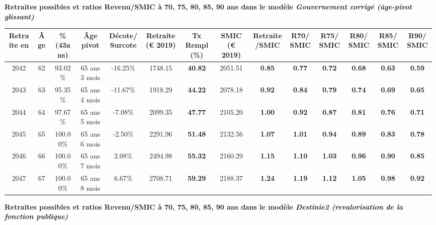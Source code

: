  \vspace{0.1cm} 
{\bf \noindent Retraites possibles et ratios Revenu/SMIC à 70, 75, 80, 85, 90 ans dans le modèle \emph{Gouvernement corrigé (âge-pivot glissant)}}  
 
\begin{adjustbox}{max width=\textwidth} 
\begin{tabular}[htb]{|c|c||c|c|c||c|c||c|c||c|c|c|c|c|} 
\hline 
 Retraite en &  Âge &  \%(43ans) &  Âge pivot &  Décote/Surcote &  Retraite (\euro{} 2019) &  Tx Rempl(\%) &  SMIC (\euro{} 2019) &  Retraite/SMIC &  R70/SMIC &  R75/SMIC &  R80/SMIC &  R85/SMIC &  R90/SMIC \\ 
\hline \hline 
 2042 &  62 &  93.02\% &  65 ans 3 mois &  -16.25\% &  1748.15 &  {\bf 40.82} &  2051.51 &  {\bf {\color{red} 0.85}} &  {\bf {\color{red} 0.77}} &  {\bf {\color{red} 0.72}} &  {\bf {\color{red} 0.68}} &  {\bf {\color{red} 0.63}} &  {\bf {\color{red} 0.59}} \\ 
\hline 
 2043 &  63 &  95.35\% &  65 ans 4 mois &  -11.67\% &  1918.29 &  {\bf 44.22} &  2078.18 &  {\bf {\color{red} 0.92}} &  {\bf {\color{red} 0.84}} &  {\bf {\color{red} 0.79}} &  {\bf {\color{red} 0.74}} &  {\bf {\color{red} 0.69}} &  {\bf {\color{red} 0.65}} \\ 
\hline 
 2044 &  64 &  97.67\% &  65 ans 5 mois &  -7.08\% &  2099.35 &  {\bf 47.77} &  2105.20 &  {\bf {\color{red} 1.00}} &  {\bf {\color{red} 0.92}} &  {\bf {\color{red} 0.87}} &  {\bf {\color{red} 0.81}} &  {\bf {\color{red} 0.76}} &  {\bf {\color{red} 0.71}} \\ 
\hline 
 2045 &  65 &  100.00\% &  65 ans 6 mois &  -2.50\% &  2291.96 &  {\bf 51.48} &  2132.56 &  {\bf 1.07} &  {\bf 1.01} &  {\bf {\color{red} 0.94}} &  {\bf {\color{red} 0.89}} &  {\bf {\color{red} 0.83}} &  {\bf {\color{red} 0.78}} \\ 
\hline 
 2046 &  66 &  100.00\% &  65 ans 7 mois &  2.08\% &  2494.98 &  {\bf 55.32} &  2160.29 &  {\bf 1.15} &  {\bf 1.10} &  {\bf 1.03} &  {\bf {\color{red} 0.96}} &  {\bf {\color{red} 0.90}} &  {\bf {\color{red} 0.85}} \\ 
\hline 
 2047 &  67 &  100.00\% &  65 ans 8 mois &  6.67\% &  2708.71 &  {\bf 59.29} &  2188.37 &  {\bf 1.24} &  {\bf 1.19} &  {\bf 1.12} &  {\bf 1.05} &  {\bf {\color{red} 0.98}} &  {\bf {\color{red} 0.92}} \\ 
\hline 
\hline 
\end{tabular} 
\end{adjustbox} 
 
 \vspace{0.1cm} 
{\bf \noindent Retraites possibles et ratios Revenu/SMIC à 70, 75, 80, 85, 90 ans dans le modèle \emph{Destinie2 (revalorisation de la fonction publique)}}  
 
